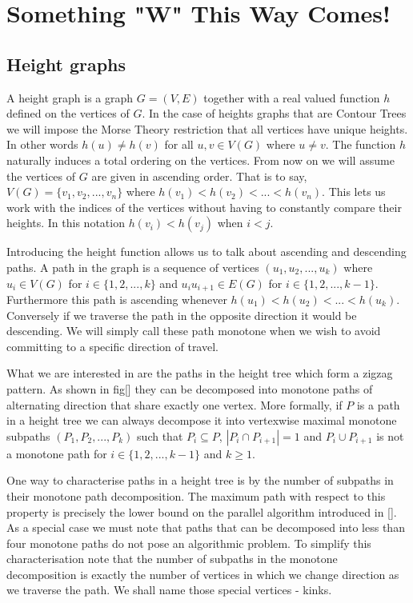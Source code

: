 \chapter{Something "W" This Way Comes!}
\label{chapter2}

\section{Height graphs}

A height graph is a graph $G = (V, E)$ together with a real valued function $h$ defined on the vertices of $G$. In the case of heights graphs that are Contour Trees we will impose the Morse Theory restriction that all vertices have unique heights. In other words $h(u) \ne h(v)$ for all $u ,v \in V(G)$ where $u \ne v$. The function $h$ naturally induces a total ordering on the vertices. From now on we will assume the vertices of $G$ are given in ascending order. That is to say, $V(G) = \{v_1, v_2, ... , v_n\}$ where $h(v_1) < h(v_2) < ... < h(v_n)$. This lets us work with the indices of the vertices without having to constantly compare their heights. In this notation $h(v_i) < h(v_j)$ when $i < j$.


Introducing the height function allows us to talk about ascending and descending paths. A path in the graph is a sequence of vertices $(u_1, u_2, ... , u_k)$ where $u_i \in V(G)$ for $i \in \{1, 2, ..., k\}$ and $u_iu_{i+1} \in E(G)$ for $i \in \{1, 2, ..., k-1\}$. Furthermore this path is ascending whenever $h(u_1) < h(u_2) < ... < h(u_k)$. Conversely if we traverse the path in the opposite direction it would be descending. We will simply call these path monotone when we wish to avoid committing to a specific direction of travel.

What we are interested in are the paths in the height tree which form a zigzag pattern. As shown in fig[] they can be decomposed into monotone paths of alternating direction that share exactly one vertex. More formally, if $P$ is a path in a height tree we can always decompose it into vertexwise maximal monotone subpaths $(P_1, P_2, ..., P_k)$ such that $P_i \subseteq P$, $|P_i \cap P_{i+1}| = 1$ and $P_i \cup P_{i+1}$ is not a monotone path for $i \in \{1, 2, ..., k-1\}$ and $k \ge 1$. 

One way to characterise paths in a height tree is by the number of subpaths in their monotone path decomposition. The maximum path with respect to this property is precisely the lower bound on the parallel algorithm introduced in []. As a special case we must note that paths that can be decomposed into less than four monotone paths do not pose an algorithmic problem. To simplify this characterisation note that the number of subpaths in the monotone decomposition is exactly the number of vertices in which we change direction as we traverse the path. We shall name those special vertices - kinks.

